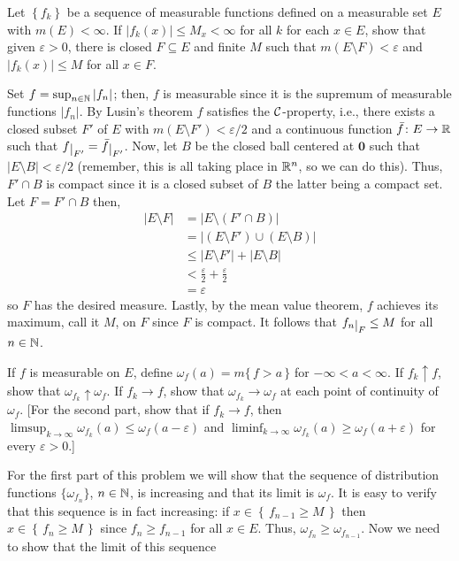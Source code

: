\begin{problem}
  Let $\left\{f_k\right\}$ be a sequence of measurable functions defined on
  a measurable set $E$ with $m(E)<\infty$. If $|f_k(x)|\leq M_x<\infty$ for
  all $k$ for each $x\in E$, show that given $\varepsilon>0$, there is
  closed $F\subseteq E$ and finite $M$ such that
  $m(E\setminus F)<\varepsilon$ and $|f_k(x)|\leq M$ for all $x\in F$.
\end{problem}
\begin{solution}
  Set $f=\sup_{n\in\mathbb{N}} |f_n|$; then, $f$ is measurable since it is the
  supremum of measurable functions $|f_n|$. By Lusin's theorem $f$
  satisfies the $\mathcal{C}$-property, i.e., there exists a closed subset $F'$
  of $E$ with $m(E\setminus F')<\varepsilon/2$ and a continuous function
  $\bar f\colon E\to\mathbb{R}$ such that $f\restrict{F'}=\bar
  f\restrict{F'}$. Now, let $B$ be the closed ball centered at $\mathbf{0}$
  such that $|E\setminus B|<\varepsilon/2$ (remember, this is all taking
  place in $\mathbb{R}^n$, so we can do this). Thus, $F'\cap B$ is compact since
  it is a closed subset of $B$ the latter being a compact set. Let
  $F=F'\cap B$ then,
  \begin{align*}
    |E\setminus F|
    &=|E\setminus(F'\cap B)|\\
    &=|(E\setminus F')\cup(E\setminus B)|\\
    &\leq|E\setminus F'|+|E\setminus B|\\
    &<\frac{\varepsilon}{2}+\frac{\varepsilon}{2}\\
    &=\varepsilon
  \end{align*}
  so $F$ has the desired measure. Lastly, by the mean value theorem, $f$
  achieves its maximum, call it $M$, on $F$ since $F$ is compact. It
  follows that $f_n\restrict{F}\leq M$ for all $n\in\mathbb{N}$.
\end{solution}

\begin{problem}
  If $f$ is measurable on $E$, define
  $\omega_f(a)=m\{\,f>a\,\}$ for $-\infty<a<\infty$. If
  $f_k\uparrow f$, show that $\omega_{f_k}\uparrow\omega_f$. If $f_k\to f$,
  show that $\omega_{f_k}\to\omega_f$ at each point of continuity of
  $\omega_f$. [For the second part, show that if $f_k\to f$, then
  $\limsup_{k\to\infty}\omega_{f_k}(a)\leq\omega_f(a-\varepsilon)$ and
  $\liminf_{k\to\infty}\omega_{f_k}(a)\geq\omega_f(a+\varepsilon)$ for
  every $\varepsilon>0$.]
\end{problem}
\begin{solution}
  For the first part of this problem we will show that the sequence of
  distribution functions $\{\omega_{f_n}\}$, $n\in\mathbb{N}$, is increasing and
  that its limit is $\omega_f$. It is easy to verify that this sequence is
  in fact increasing: if $x\in\left\{\,f_{n-1}\geq M\,\right\}$ then
  $x\in\left\{\,f_n\geq M\,\right\}$ since $f_n\geq f_{n-1}$ for all $x\in
  E$. Thus, $\omega_{f_n}\geq\omega_{f_{n-1}}$. Now we need to show that
  the limit of this sequence
\end{solution}

